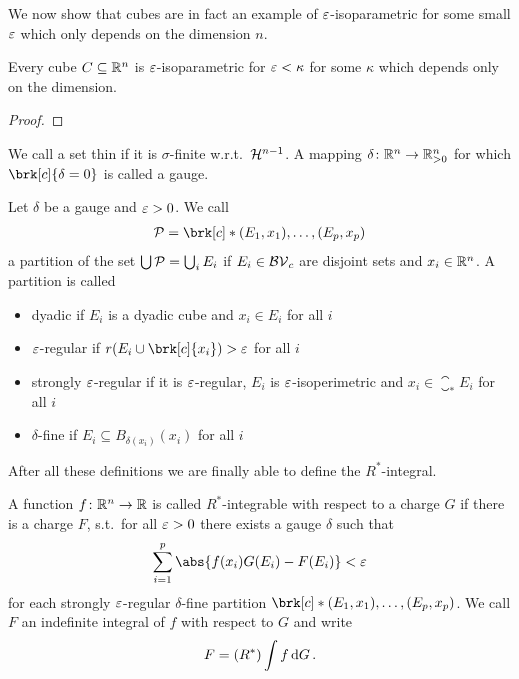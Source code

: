 We now show that cubes are in fact an example of $\varepsilon$-isoparametric for some small $\varepsilon$ which only depends on the dimension $n$.
\begin{proposition}
Every cube $C\subseteq\mathbb{R}^n$ is $\varepsilon$-isoparametric for $\varepsilon<\kappa$ for some $\kappa$ which depends only on the dimension.
\end{proposition}
\begin{proof}
\end{proof}

\begin{definition}[Gauge]
We call a set thin if it is $\sigma$-finite w.r.t.\ $\mathcal{H}^{n-1}$. A mapping $\delta\colon\mathbb{R}^n\to\mathbb{R}^n_{>0}$ for which $\brk[c]{\delta=0}$ is called a gauge.
\end{definition}

\begin{definition}[Partitions]
Let $\delta$ be a gauge and $\varepsilon>0$.
We call
\begin{align*}
	\cP=\brk[c]*{(E_1,x_1),\dots, (E_p,x_p)}
\end{align*}
a partition of the set $\bigcup\mathcal{P}=\bigcup_iE_i$ if $E_i\in\mathcal{BV}_c$ are disjoint sets and $x_i\in\mathbb{R}^n$. A partition is called
\begin{itemize}
	\item dyadic if $E_i$ is a dyadic cube and $x_i\in E_i$ for all $i$
	\item $\varepsilon$-regular if $r(E_i\cup\brk[c]{x_i})>\e$ for all $i$
	\item strongly $\varepsilon$-regular if it is $\varepsilon$-regular, $E_i$ is $\varepsilon$-isoperimetric and $x_i\in\closure_*E_i$ for all $i$
	\item $\delta$-fine if $E_i\subseteq B_{\delta(x_i)}(x_i)$ for all $i$
\end{itemize}
\end{definition}

After all these definitions we are finally able to define the $R^*$-integral.

\begin{definition}[$R^*$-integral]
A function $f\colon \mathbb{R}^n\to\mathbb{R}$ is called $R^*$-integrable with respect to a charge $G$ if there is a charge $F$, s.t.\ for all $\varepsilon>0$ there exists a gauge $\delta$ such that
\begin{align*}
	\sum_{i=1}^p\abs{f(x_i)G(E_i)-F(E_i)}<\e
\end{align*}
for each strongly $\varepsilon$-regular $\delta$-fine partition $\brk[c]*{(E_1,x_1),\dots,(E_p,x_p)}$. We call $F$ an indefinite integral of $f$ with respect to $G$ and write
\begin{align*}
	F=(R^*)\int f\,\mathrm{d} G\,.
\end{align*}
\end{definition}


